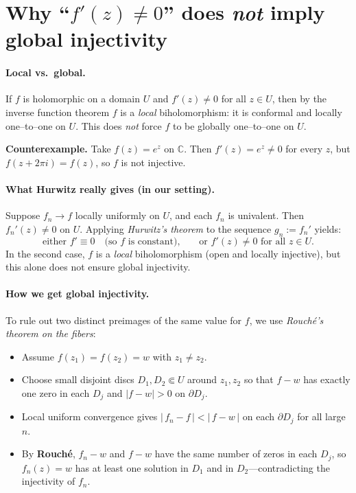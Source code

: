 \documentclass[12pt,a4paper]{article}
\newcommand{\C}{\mathbb{C}}
\begin{document}
\section*{Why ``$f'(z)\neq 0$'' does \emph{not} imply global injectivity}

\paragraph{Local vs.\ global.}
If $f$ is holomorphic on a domain $U$ and $f'(z)\neq 0$ for all $z\in U$,
then by the inverse function theorem $f$ is a \emph{local} biholomorphism:
it is conformal and locally one–to–one on $U$.
This does \emph{not} force $f$ to be globally one–to–one on $U$.

\medskip
\textbf{Counterexample.}
Take $f(z)=e^{z}$ on $\C$.  Then $f'(z)=e^{z}\neq 0$ for every $z$,
but $f(z+2\pi i)=f(z)$, so $f$ is not injective.

\bigskip
\paragraph{What Hurwitz really gives (in our setting).}
Suppose $f_n\to f$ locally uniformly on $U$, and each $f_n$ is univalent.
Then $f_n'(z)\neq 0$ on $U$.
Applying \emph{Hurwitz’s theorem} to the sequence $g_n:=f_n'$ yields:
\[
\text{either } f'\equiv 0 \quad\text{(so $f$ is constant),}\qquad
\text{or } f'(z)\neq 0 \text{ for all } z\in U.
\]
In the second case, $f$ is a \emph{local} biholomorphism (open and locally injective),
but this alone does not ensure global injectivity.

\bigskip
\paragraph{How we get global injectivity.}
To rule out two distinct preimages of the same value for $f$, we use
\emph{Rouch\'e’s theorem on the fibers}:

\begin{itemize}
	\item Assume $f(z_1)=f(z_2)=w$ with $z_1\neq z_2$.
	\item Choose small disjoint discs $D_1,D_2\Subset U$ around $z_1,z_2$
	so that $f-w$ has exactly one zero in each $D_j$ and $|f-w|>0$ on $\partial D_j$.
	\item Local uniform convergence gives $|\,f_n-f\,|<|\,f-w\,|$ on each $\partial D_j$
	for all large $n$.
	\item By \textbf{Rouch\'e}, $f_n-w$ and $f-w$ have the same number of zeros in each $D_j$,
	so $f_n(z)=w$ has at least one solution in $D_1$ and in $D_2$—contradicting
	the injectivity of $f_n$.
\end{itemize}
\end{document}
